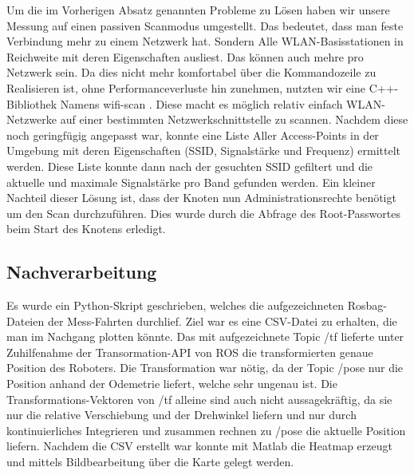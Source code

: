 \documentclass{scrartcl}%
\begin{document}
Um die im Vorherigen Absatz genannten Probleme zu Lösen haben wir unsere Messung auf einen passiven Scanmodus umgestellt. Das bedeutet, dass man feste Verbindung mehr zu einem Netzwerk hat. Sondern Alle WLAN-Basisstationen in Reichweite mit deren Eigenschaften ausliest. Das können auch mehre pro Netzwerk sein. Da dies nicht mehr komfortabel über die Kommandozeile zu Realisieren ist, ohne Performanceverluste hin zunehmen, nutzten wir eine C++-Bibliothek Namens wifi-scan \cite{bmegliWifiScan}. Diese macht es möglich relativ einfach WLAN-Netzwerke auf einer bestimmten Netzwerkschnittstelle zu scannen. Nachdem diese noch geringfügig angepasst war, konnte eine Liste Aller Access-Points in der Umgebung mit deren Eigenschaften (SSID, Signalstärke und Frequenz) ermittelt werden. Diese Liste konnte dann nach der gesuchten SSID gefiltert und die aktuelle und maximale Signalstärke pro Band gefunden werden. Ein kleiner Nachteil dieser Lösung ist, dass der Knoten nun Administrationsrechte benötigt um den Scan durchzuführen. Dies wurde durch die  Abfrage des Root-Passwortes beim Start des Knotens erledigt. 



\subsection{Nachverarbeitung}
Es wurde ein Python-Skript geschrieben, welches die aufgezeichneten Rosbag-Dateien der Mess-Fahrten durchlief. Ziel war es eine CSV-Datei zu erhalten, die man im Nachgang plotten könnte. Das mit aufgezeichnete Topic /tf lieferte unter Zuhilfenahme der Transormation-API von ROS die transformierten genaue Position des Roboters. Die Transformation war nötig, da der Topic /pose nur die Position anhand der Odemetrie liefert, welche sehr ungenau ist. Die Transformations-Vektoren von /tf alleine sind auch nicht aussagekräftig, da sie nur die relative Verschiebung und der Drehwinkel liefern und nur durch kontinuierliches Integrieren und zusammen rechnen zu /pose die aktuelle Position liefern. Nachdem die CSV erstellt war konnte mit Matlab die Heatmap erzeugt und mittels Bildbearbeitung über die Karte gelegt werden.

\newpage
\end{document}
